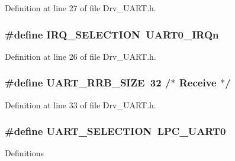 Definition at line 27 of file Drv\+\_\+\+U\+A\+R\+T.\+h.

\subsubsection[{\texorpdfstring{I\+R\+Q\+\_\+\+S\+E\+L\+E\+C\+T\+I\+ON}{IRQ_SELECTION}}]{\setlength{\rightskip}{0pt plus 5cm}\#define I\+R\+Q\+\_\+\+S\+E\+L\+E\+C\+T\+I\+ON~{\bf U\+A\+R\+T0\+\_\+\+I\+R\+Qn}}\hypertarget{group__UART__Library_ga7c3d3b9d5cf2685f7fdb298eaf359875}{}\label{group__UART__Library_ga7c3d3b9d5cf2685f7fdb298eaf359875}


Definition at line 26 of file Drv\+\_\+\+U\+A\+R\+T.\+h.

\subsubsection[{\texorpdfstring{U\+A\+R\+T\+\_\+\+R\+R\+B\+\_\+\+S\+I\+ZE}{UART_RRB_SIZE}}]{\setlength{\rightskip}{0pt plus 5cm}\#define U\+A\+R\+T\+\_\+\+R\+R\+B\+\_\+\+S\+I\+ZE~32	/$\ast$ Receive $\ast$/}\hypertarget{group__UART__Library_gaf9c71990720971fa35b971b5e305c05b}{}\label{group__UART__Library_gaf9c71990720971fa35b971b5e305c05b}


Definition at line 33 of file Drv\+\_\+\+U\+A\+R\+T.\+h.

\subsubsection[{\texorpdfstring{U\+A\+R\+T\+\_\+\+S\+E\+L\+E\+C\+T\+I\+ON}{UART_SELECTION}}]{\setlength{\rightskip}{0pt plus 5cm}\#define U\+A\+R\+T\+\_\+\+S\+E\+L\+E\+C\+T\+I\+ON~{\bf L\+P\+C\+\_\+\+U\+A\+R\+T0}}\hypertarget{group__UART__Library_ga43200fe4a9ea07a8a7f41b484fce9a18}{}\label{group__UART__Library_ga43200fe4a9ea07a8a7f41b484fce9a18}
Definitions 

